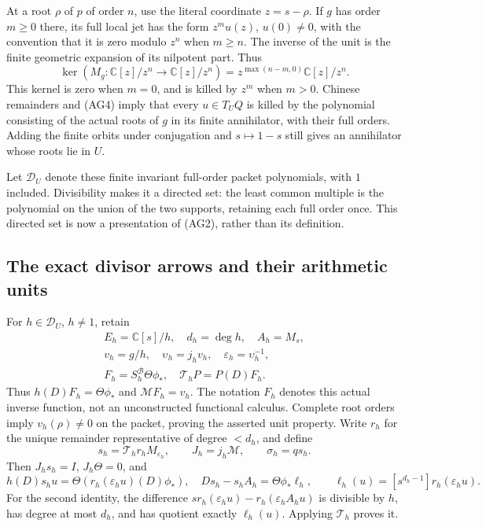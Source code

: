 At a root $\rho$ of $p$ of order $n$, use the literal coordinate
$z=s-\rho$.  If $g$ has order $m\ge0$ there, its full local jet
has the form $z^m u(z)$, $u(0)\ne0$, with the convention that it
is zero modulo $z^n$ when $m\ge n$.  The inverse of the unit
is the finite geometric expansion of its nilpotent part.  Thus
\[
 \ker(M_g:\mathbb C[z]/z^n\to\mathbb C[z]/z^n)
       =z^{\max(n-m,0)}\mathbb C[z]/z^n.
 \tag{AG5}
\]
This kernel is zero when $m=0$, and is killed by $z^m$ when
$m>0$.  Chinese remainders and (AG4) imply that every $u\in T_UQ$
is killed by the polynomial consisting of the actual roots of $g$
in its finite annihilator, with their full orders.  Adding the
finite orbits under conjugation and $s\mapsto1-s$ still gives an
annihilator whose roots lie in $U$.

Let $\mathcal D_U$ denote these finite invariant full-order packet
polynomials, with $1$ included.  Divisibility makes it a directed
set: the least common multiple is the polynomial on the union of
the two supports, retaining each full order once.  This directed
set is now a presentation of (AG2), rather than its definition.

\subsection{The exact divisor arrows and their arithmetic units}

For $h\in\mathcal D_U$, $h\ne1$, retain
\[
 \begin{gathered}
 E_h=\mathbb C[s]/h,\quad d_h=\deg h,\quad A_h=M_s,\\
 v_h=g/h,\quad \upsilon_h=j_hv_h,\quad
 \varepsilon_h=\upsilon_h^{-1},\\
 F_h=S_h^{\mathscr B}\Theta\phi_*,\quad
 \mathcal T_hP=P(D)F_h.
 \end{gathered}
 \tag{AG6}
\]
Thus $h(D)F_h=\Theta\phi_*$ and $\mathcal MF_h=v_h$.
The notation $F_h$ denotes this actual inverse function, not an
unconstructed functional calculus.  Complete root orders imply
$v_h(\rho)\ne0$ on the packet, proving the asserted unit property.
Write $r_h$ for the unique remainder representative of degree $<d_h$,
and define
\[
 s_h=\mathcal T_h r_h M_{\varepsilon_h},\qquad
 J_h=j_h\mathcal M,\qquad \sigma_h=qs_h.
 \tag{AG7}
\]
Then $J_hs_h=I$, $J_h\Theta=0$, and
\[
 h(D)s_hu=\Theta(r_h(\varepsilon_hu)(D)\phi_*),\quad
 D s_h-s_hA_h=\Theta\phi_*\ell_h,
 \qquad\ell_h(u)=[s^{d_h-1}]r_h(\varepsilon_hu).
 \tag{AG8}
\]
For the second identity, the difference
$s r_h(\varepsilon_hu)-r_h(\varepsilon_h A_hu)$ is divisible
by $h$, has degree at most $d_h$, and has quotient exactly
$\ell_h(u)$.  Applying $\mathcal T_h$ proves it.

